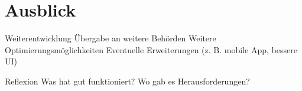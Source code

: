 \section*{Ausblick}

Weiterentwicklung 
Übergabe an weitere Behörden
Weitere Optimierungsmöglichkeiten
Eventuelle Erweiterungen (z. B. mobile App, bessere UI)

Reflexion 
Was hat gut funktioniert?
Wo gab es Herausforderungen?

